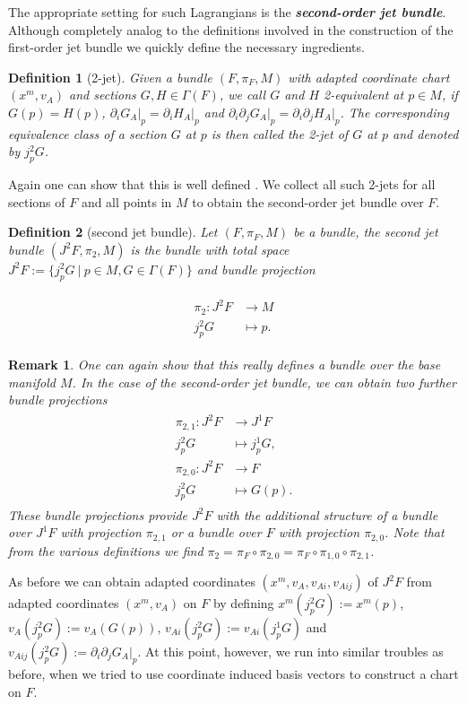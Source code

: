 \documentclass[a4paper,12pt, DIV=14, BCOR=5mm, twoside, headsepline, numbers=noenddot]{scrbook}
\newtheorem{definition}{Definition}[section]
\newtheorem*{remark}{Remark}
\begin{document}
The appropriate setting for such Lagrangians is the \textbf{\textit{second-order jet bundle}}. Although completely analog to the definitions involved in the construction of the first-order jet bundle we quickly define the necessary ingredients. 
\begin{definition}[2-jet]
Given a bundle $(F, \pi_F, M)$ with adapted coordinate chart $(x^m, v_A)$ and sections $G,H \in \Gamma(F)$, we call $G$ and $H$ 2-equivalent at $p \in M$, if $G(p) = H(p)$, $\partial_i G_A \vert_p = \partial_i H_A \vert_p$ and $\partial_i \partial_j G_A \vert_ p = \partial_i \partial_j H_A \vert_ p $. The corresponding equivalence class of a section $G$ at $p$ is then called the 2-jet of $G$ at $p$ and denoted by $j^2_pG$.
\end{definition}
Again one can show that this is well defined \cite{saunders_1989}. We collect all such 2-jets for all sections of $F$ and all points in $M$ to obtain the second-order jet bundle over $F$.
\begin{definition}[second jet bundle]
Let $(F, \pi_F, M)$ be a bundle, the second jet bundle $(J^2F,\pi_2,M)$ is the bundle with total space $J^2F := \{j^2_pG \  \vert \  p \in M, G \in \Gamma(F)\}$ and bundle projection 

\begin{align}
    \begin{aligned}
\pi_2 : J^2F &\longrightarrow M \\
j^2_pG &\longmapsto p.
    \end{aligned}
\end{align}
\end{definition}
\begin{remark}
One can again show that this really defines a bundle over the base manifold $M$. In the case of the second-order jet bundle, we can obtain two further bundle projections 
\begin{align}
    \begin{aligned}
    \pi_{2,1} : J^2F &\longrightarrow J^1F \\
    j^2_pG &\longmapsto j^1_pG ,\\[0.5ex]
    \pi_{2,0} : J^2F &\longrightarrow F \\
    j^2_pG &\longmapsto G(p).
    \end{aligned}
\end{align}
These bundle projections provide $J^2F$ with the additional structure of a bundle over $J^1F$ with projection $\pi_{2,1}$ or a bundle over $F$ with projection $\pi_{2,0}$. Note that from the various definitions we find $\pi_{2} = \pi_F \circ \pi_{2,0} = \pi_F \circ \pi_{1,0} \circ \pi_{2,1}$.
\end{remark}
As before we can obtain adapted coordinates $(x^m, v_A, v_{Ai},v_{Aij})$ of $J^2F$ from adapted coordinates $(x^m,v_A)$ on $F$ by defining $x^m(j^2_pG) := x^m(p)$, $v_A(j^2_pG):= v_A(G(p))$, $v_{Ai}(j^2_pG) := v_{Ai}(j^1_pG)$ and $v_{Aij}(j^2_pG) := \partial_i \partial_j G_A \vert _p$. 
At this point, however, we run into similar troubles as before, when we tried to use coordinate induced basis vectors to construct a chart on $F$. 
\end{document}
